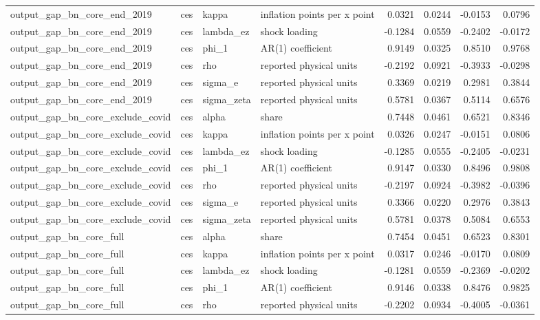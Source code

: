 \begin{tabular}{llllrrrr}
output\_gap\_bn\_core\_end\_2019 & ces & kappa & inflation points per x point & 0.0321 & 0.0244 & -0.0153 & 0.0796 \\
output\_gap\_bn\_core\_end\_2019 & ces & lambda\_ez & shock loading & -0.1284 & 0.0559 & -0.2402 & -0.0172 \\
output\_gap\_bn\_core\_end\_2019 & ces & phi\_1 & AR(1) coefficient & 0.9149 & 0.0325 & 0.8510 & 0.9768 \\
output\_gap\_bn\_core\_end\_2019 & ces & rho & reported physical units & -0.2192 & 0.0921 & -0.3933 & -0.0298 \\
output\_gap\_bn\_core\_end\_2019 & ces & sigma\_e & reported physical units & 0.3369 & 0.0219 & 0.2981 & 0.3844 \\
output\_gap\_bn\_core\_end\_2019 & ces & sigma\_zeta & reported physical units & 0.5781 & 0.0367 & 0.5114 & 0.6576 \\
output\_gap\_bn\_core\_exclude\_covid & ces & alpha & share & 0.7448 & 0.0461 & 0.6521 & 0.8346 \\
output\_gap\_bn\_core\_exclude\_covid & ces & kappa & inflation points per x point & 0.0326 & 0.0247 & -0.0151 & 0.0806 \\
output\_gap\_bn\_core\_exclude\_covid & ces & lambda\_ez & shock loading & -0.1285 & 0.0555 & -0.2405 & -0.0231 \\
output\_gap\_bn\_core\_exclude\_covid & ces & phi\_1 & AR(1) coefficient & 0.9147 & 0.0330 & 0.8496 & 0.9808 \\
output\_gap\_bn\_core\_exclude\_covid & ces & rho & reported physical units & -0.2197 & 0.0924 & -0.3982 & -0.0396 \\
output\_gap\_bn\_core\_exclude\_covid & ces & sigma\_e & reported physical units & 0.3366 & 0.0220 & 0.2976 & 0.3843 \\
output\_gap\_bn\_core\_exclude\_covid & ces & sigma\_zeta & reported physical units & 0.5781 & 0.0378 & 0.5084 & 0.6553 \\
output\_gap\_bn\_core\_full & ces & alpha & share & 0.7454 & 0.0451 & 0.6523 & 0.8301 \\
output\_gap\_bn\_core\_full & ces & kappa & inflation points per x point & 0.0317 & 0.0246 & -0.0170 & 0.0809 \\
output\_gap\_bn\_core\_full & ces & lambda\_ez & shock loading & -0.1281 & 0.0559 & -0.2369 & -0.0202 \\
output\_gap\_bn\_core\_full & ces & phi\_1 & AR(1) coefficient & 0.9146 & 0.0338 & 0.8476 & 0.9825 \\
output\_gap\_bn\_core\_full & ces & rho & reported physical units & -0.2202 & 0.0934 & -0.4005 & -0.0361 \\

\end{tabular}
